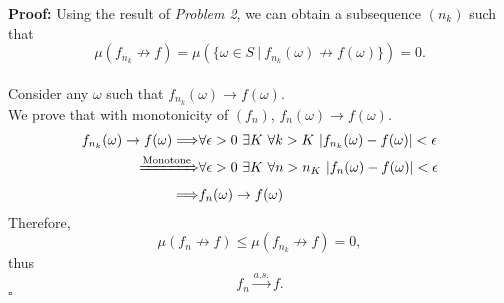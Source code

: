 \documentclass[UTF8, 12pt]{article}
\newenvironment{proof}{\noindent\ignorespaces\textbf{Proof:}}{\hfill $\square$\par\noindent}
\begin{document}
    \text{}

    \begin{proof}
        Using the result of \textit{Problem 2}, we can obtain a subsequence $(n_k)$ such that  $$ \mu(f_{n_k} \not\rightarrow f) = \mu(\{\omega\in S \ |\ f_{n_k}(\omega) \not\rightarrow f(\omega)\}) = 0 .$$ \\
        Consider any $\omega$ such that $f_{n_k}(\omega) \rightarrow f(\omega)$. \\
        We prove that with monotonicity of $(f_n)$, $f_{n}(\omega) \rightarrow f(\omega)$. \\
        \begin{align*}
            f_{n_k}(\omega) \rightarrow f(\omega) \Longrightarrow &\forall \epsilon > 0\ \exists K\ \forall k > K\ |f_{n_k}(\omega) - f(\omega)| < \epsilon \\
            \xRightarrow{\text{Monotone}} &\forall \epsilon > 0\ \exists K\ \forall n > n_K\  |f_{n}(\omega) - f(\omega)| < \epsilon \\
            \Longrightarrow &f_{n}(\omega) \rightarrow f(\omega) 
        \end{align*}
        Therefore, $$ \mu(f_{n} \not\rightarrow f) \leq \mu(f_{n_k} \not\rightarrow f) = 0, $$
        thus $$ f_{n} \overset{a.s.}{\longrightarrow} f .$$ 
    \end{proof}
\end{document}
